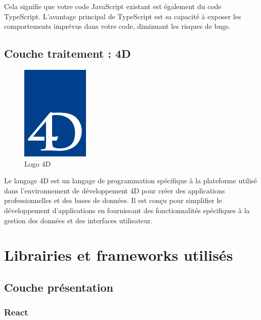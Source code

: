 Cela signifie que votre code JavaScript existant est également du code TypeScript. L’avantage principal de TypeScript est sa capacité à exposer les comportements imprévus dans votre code, diminuant les risques de bugs.\cite{Typescript}

\subsection{Couche traitement : 4D}

\begin{figure}[H]
    \centering
    \includegraphics[scale=0.8]{Logos/Logo-4D.jpg}
    \caption{Logo 4D}
\end{figure}

Le langage 4D est un langage de programmation spécifique à la plateforme utilisé dans l’environnement de développement 4D pour créer des applications professionnelles et
des bases de données. Il est conçu pour simplifier le développement d’applications en fournissant des fonctionnalités
spécifiques à la gestion des données et des interfaces utilisateur.

\section{Librairies et frameworks utilisés}

\subsection{Couche présentation}

\subsubsection{React}


